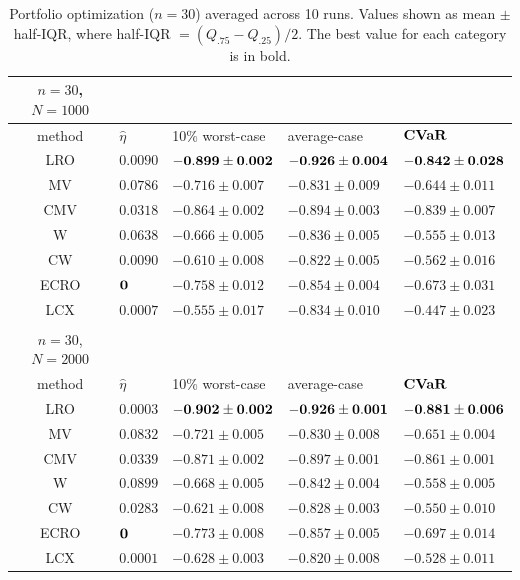 \documentclass[11pt]{article}
\begin{document}
\begin{table}[ht]
  \centering
  \fontsize{9}{11}\selectfont
{
	\begin{tabular}{cllll}   \toprule   
		$n=30$, $N=1000$ & & & & \\
             \midrule
		method & $\hat{\eta}$ & 10\% worst-case & average-case & $\mathop{\bf CVaR}$ \\
 \midrule
         LRO & $0.0090$ & $\bf{-0.899 \pm 0.002}$ & $\bf{-0.926 \pm 0.004}$ &$\bf{-0.842 \pm 0.028}$\\
        \midrule 
        MV & $0.0786$ & $-0.716 \pm 0.007$ & $-0.831 \pm 0.009$ &$-0.644 \pm 0.011$\\
        \midrule 
        CMV & $0.0318$ & $-0.864 \pm 0.002$ & $-0.894 \pm 0.003$ &$-0.839 \pm 0.007$\\
        \midrule 
        W & $0.0638$ & $-0.666 \pm 0.005$ & $-0.836 \pm 0.005$ &$-0.555 \pm 0.013$\\
        \midrule 
        CW & $0.0090$ & $-0.610 \pm 0.008$ & $-0.822 \pm 0.005$ &$-0.562 \pm 0.016$\\
        \midrule 
        ECRO & $\bf{0}$ & $-0.758 \pm 0.012$ & $-0.854 \pm 0.004$ &$-0.673 \pm 0.031$\\
        \midrule 
        LCX & $0.0007$ & $-0.555 \pm 0.017$ & $-0.834 \pm 0.010$ &$-0.447 \pm 0.023$\\
        \bottomrule \\[-8pt]
                \toprule 
		$n=30$, $N=2000$ & & & & \\
             \midrule
		method & $\hat{\eta}$ & 10\% worst-case & average-case & $\mathop{\bf CVaR}$ \\
 \midrule
         LRO & $0.0003$ & $\bf{-0.902 \pm 0.002}$ & $\bf{-0.926 \pm 0.001}$ &$\bf{-0.881 \pm 0.006}$\\
        \midrule 
        MV & $0.0832$ & $-0.721 \pm 0.005$ & $-0.830 \pm 0.008$ &$-0.651 \pm 0.004$\\
        \midrule 
        CMV & $0.0339$ & $-0.871 \pm 0.002$ & $-0.897 \pm 0.001$ &$-0.861 \pm 0.001$\\
        \midrule 
        W & $0.0899$ & $-0.668 \pm 0.005$ & $-0.842 \pm 0.004$ &$-0.558 \pm 0.005$\\
        \midrule 
        CW & $0.0283$ & $-0.621 \pm 0.008$ & $-0.828 \pm 0.003$ &$-0.550 \pm 0.010$\\
        \midrule 
        ECRO & $\bf{0}$ & $-0.773 \pm 0.008$ & $-0.857 \pm 0.005$ &$-0.697 \pm 0.014$\\
        \midrule 
        LCX & $0.0001$ & $-0.628 \pm 0.003$ & $-0.820 \pm 0.008$ &$-0.528 \pm 0.011$\\
 \bottomrule
		\end{tabular}}
		\caption{Portfolio optimization ($n=30$) averaged across 10 runs. Values shown as mean $\pm$ half-IQR, where half-IQR $= (Q_{.75} - Q_{.25})/2$. The best value for each category is in bold.}
		\label{table:port_n30}
        \vspace{-1em}
\end{table}
 
\end{document}
